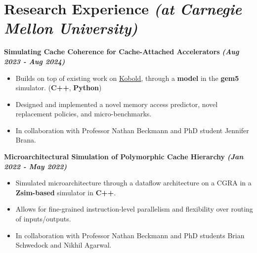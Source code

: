 \documentclass[10pt]{article}
\begin{document}

    \section*{{\Large \textcolor{lighterB}{Research Experience}} {\normalsize \textit{\textcolor{lighterB}{(at Carnegie Mellon University)}}}}

  \textbf{\large Simulating Cache Coherence for Cache-Attached Accelerators} {\hfill \textit{\textbf{(Aug 2023 - Aug 2024)}}}
  \vspace*{-0.17cm}
  \begin{itemize}
    \itemsep0em
    \item \textcolor{lighterG}{Builds on top of existing work on \href{https://ieeexplore.ieee.org/document/10106564}{\underline{Kobold}}, through a \textbf{model} in the \textbf{gem5} simulator. (\textbf{C++}, \textbf{Python})}
    \item \textcolor{lighterG}{Designed and implemented a novel memory access predictor,
        novel replacement policies, and micro-benchmarks.}
    \item \textcolor{lighterG}{In collaboration with Professor Nathan Beckmann and PhD student Jennifer Brana.}
  \end{itemize}

  \textbf{\large Microarchitectural Simulation of Polymorphic Cache Hierarchy} {\hfill \textit{\textbf{(Jan 2022 - May 2022)}}}
  \vspace*{-0.17cm}
  \begin{itemize}
    \itemsep0em
    \item \textcolor{lighterG}{Simulated microarchitecture through a dataflow architecture on a CGRA in a \textbf{Zsim-based} simulator in \textbf{C++}.}
    \item \textcolor{lighterG}{Allows for fine-grained instruction-level parallelism and flexibility over routing of inputs/outputs.}
    \item \textcolor{lighterG}{In collaboration with Professor Nathan Beckmann and PhD students Brian Schwedock and Nikhil Agarwal.}
  \end{itemize}
\end{document}
